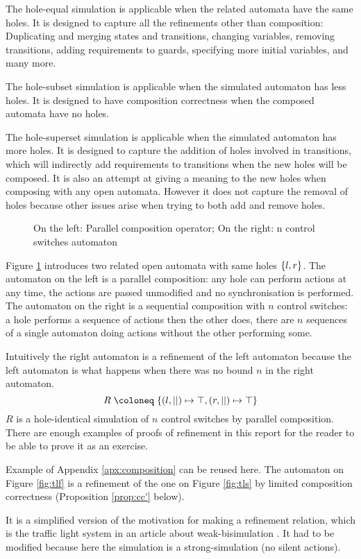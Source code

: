 \documentclass{article}
\begin{document}
The hole-equal simulation is applicable when the related automata have the same holes.
It is designed to capture all the refinements other than composition: Duplicating and merging states and transitions, changing variables, removing transitions, adding requirements to guards, specifying more initial variables, and many more.

The hole-subset simulation is applicable when the simulated automaton has less holes.
It is designed to have composition correctness when the composed automata have no holes.

The hole-superset simulation is applicable when the simulated automaton has more holes.
It is designed to capture the addition of holes involved in transitions, which will indirectly add requirements to transitions when the new holes will be composed.
It is also an attempt at giving a meaning to the new holes when composing with any open automata.
However it does not capture the removal of holes because other issues arise when trying to both add and remove holes.
\begin{exi}
\begin{figure}
\centering

\vrule

\caption{On the left: Parallel composition operator; On the right: n control switches automaton}
\label{fig:hisim}
\end{figure}
Figure \ref{fig:hisim} introduces two related open automata with same holes \({\left\{l, r\right\}}\).
The automaton on the left is a parallel composition: any hole can perform actions at any time, the actions are passed unmodified and no synchronisation is performed.
The automaton on the right is a sequential composition with \(n\) control switches: a hole performs a sequence of actions then the other does, there are \(n\) sequences of a single automaton doing actions without the other performing some.

Intuitively the right automaton is a refinement of the left automaton because the left automaton is what happens when there was no bound \(n\) in the right automaton.
\[ R \defobject \mbrc{\mpar{l, ||} \mapsto \top, \mpar{r, ||} \mapsto \top} \]
\(R\) is a hole-identical simulation of \(n\) control switches by parallel composition.
There are enough examples of proofs of refinement in this report for the reader to be able to prove it as an exercise.
\end{exi}
\begin{exi}
Example of Appendix \ref{apx:composition} can be reused here.
The automaton on Figure \ref{fig:tlf} is a refinement of the one on Figure \ref{fig:tls} by limited composition correctness (Proposition \ref{prop:cc'} below).

It is a simplified version of the motivation for making a refinement relation, which is the traffic light system in an article about weak-bisimulation \cite{wang:03126313}.
It had to be modified because here the simulation is a strong-simulation (no silent actions).
\end{exi}
\end{document}
